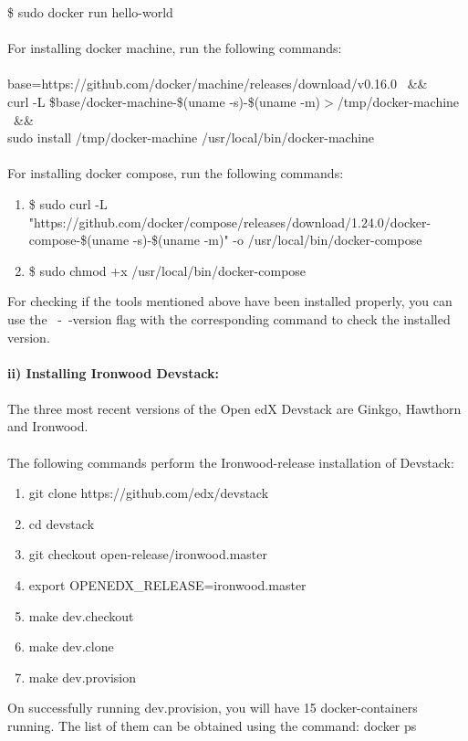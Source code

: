 \documentclass[12pt]{article}
\begin{document}
\$ sudo docker run hello-world\\\\
For installing docker machine, run the following commands:\\ \\
base=https://github.com/docker/machine/releases/download/v0.16.0 \ \&\& \\
curl -L \$base/docker-machine-\$(uname -s)-\$(uname -m)$>$/tmp/docker-machine \ \&\& \\
sudo install /tmp/docker-machine /usr/local/bin/docker-machine\\ \\
For installing docker compose, run the following commands:
\begin{enumerate}
	\item \$ sudo curl -L "https://github.com/docker/compose/releases/download/1.24.0/docker-compose-\$(uname -s)-\$(uname -m)" -o /usr/local/bin/docker-compose
	\item \$ sudo chmod +x /usr/local/bin/docker-compose
\end{enumerate}
For checking if the tools mentioned above have been installed properly, you can use the \ -\ -version flag with the corresponding command to check the installed version.\\\\
\textbf{ii) Installing Ironwood Devstack:} \\ \\
The three most recent versions of the Open edX Devstack are Ginkgo, Hawthorn and Ironwood. \\\\
The following commands perform the Ironwood-release installation of Devstack:
\begin{enumerate}
	\item git clone https://github.com/edx/devstack
	\item cd devstack
	\item git checkout open-release/ironwood.master
	\item export OPENEDX\_RELEASE=ironwood.master
	\item make dev.checkout
	\item make dev.clone
	\item make dev.provision
\end{enumerate}
On successfully running dev.provision, you will have 15 docker-containers running. The list of them can be obtained using the command:  docker ps
\\\\
\end{document}
